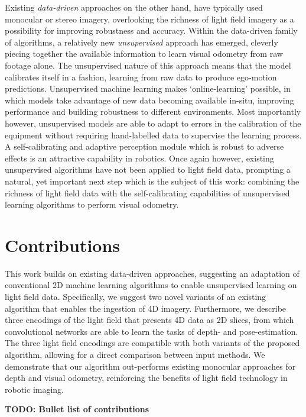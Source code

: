Existing \textit{data-driven} approaches on the other hand, have typically used monocular or stereo imagery, overlooking the richness of light field imagery as a possibility for improving robustness and accuracy. Within the data-driven family of algorithms, a relatively new \textit{unsupervised} approach has emerged, cleverly piecing together the available information to learn visual odometry from raw footage alone. The unsupervised nature of this approach means that the model calibrates itself in a fashion, learning from raw data to produce ego-motion predictions. Unsupervised machine learning makes `online-learning' possible, in which models take advantage of new data becoming available in-situ, improving performance and building robustness to different environments. Most importantly however, unsupervised models are able to adapt to errors in the calibration of the equipment without requiring hand-labelled data to supervise the learning process. A self-calibrating and adaptive perception module which is robust to adverse effects is an attractive capability in robotics. Once again however, existing unsupervised algorithms have not been applied to light field data, prompting a natural, yet important next step which is the subject of this work: combining the richness of light field data with the self-calibrating capabilities of unsupervised learning algorithms to perform visual odometry.



\section{Contributions}
This work builds on existing data-driven approaches, suggesting an adaptation of conventional 2D machine learning algorithms to enable unsupervised learning on light field data. Specifically, we suggest two novel variants of an existing algorithm that enables the ingestion of 4D imagery. Furthermore, we describe three encodings of the light field that presents 4D data as 2D slices, from which convolutional networks are able to learn the tasks of depth- and pose-estimation. The three light field encodings are compatible with both variants of the proposed algorithm, allowing for a direct comparison between input methods. We demonstrate that our algorithm out-performs existing monocular approaches for depth and visual odometry, reinforcing the benefits of light field technology in robotic imaging.

\textbf{TODO: Bullet list of contributions}

